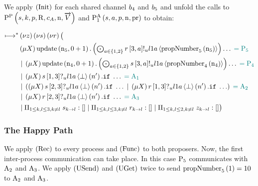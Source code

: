 We apply $\RInit$ for each shared channel $\SharedPoint{4}$ and $\SharedPoint{5}$ and unfold the calls to $\PpOne{\ChannelS, \ProcessIndexK, \ProposerRole, \QRoles, \AcceptorCount, \NumberRegister, \VectorV}$ and $\PaOne{\ChannelS, \AcceptorRole, \ProposerRole, \NumberRegister, \ProposalRegister}$ to obtain:

\begin{align*}
\mapstostar& \NuChannels\big (\\
&\Mu{\RecursionVariable} \update{\NumberRegister_5}{0 + 1} . \DotForall{\AcceptorRole\in \Curly{1, 2}}{\SendUnreliableP{\ChannelR}{3}{\AcceptorRole}{\LOneA}{\proposalNumber{\NumberRegister_5}{5}}}\ldots \comment{= \Proposer{5}}\\
&\Or \Mu{\RecursionVariable} \update{\NumberRegister_4}{0 + 1} . \DotForall{\AcceptorRole\in \Curly{1, 2}}{\SendUnreliableP{\ChannelS}{3}{\AcceptorRole}{\LOneA}{\proposalNumber{\NumberRegister_4}{4}}}\ldots \comment{= \Proposer{4}}\\
&\Or
    \Mu{\RecursionVariable}
    \ReceiveUnreliableP{\ChannelS}{1}{3}{\LOneA}{\bot}{n'}.
    \If \ldots \comment{= \Acceptor{1}}\\
&\Or \Paren{
    \Mu{\RecursionVariable} \ReceiveUnreliableP{\ChannelS}{2}{3}{\LOneA}{\bot}{n'}.\If \ldots
    \Or \Mu{\RecursionVariable} \ReceiveUnreliableP{\ChannelR}{1}{3}{\LOneA}{\bot}{n'}.\If \ldots
} \comment{= \Acceptor{2}}\\
&\Or \Mu{\RecursionVariable} \ReceiveUnreliableP{\ChannelR}{2}{3}{\LOneA}{\bot}{n'}.\If \ldots \comment{= \Acceptor{3}}\\
&\Or \InnerSessionQueues{\ChannelS}
\Or \InnerSessionQueues{\ChannelR}
\Or \OuterSessionQueues
\big )
\end{align*}

\subsubsection{The Happy Path}
We apply $\RRec$ to every process and $\RSideEffect$ to both proposers.
Now, the first inter-process communication can take place.
In this case $\Proposer{5}$ communicates with $\Acceptor{2}$ and $\Acceptor{3}$.
We apply $\RUsend$ and $\RUget$ twice to send $\proposalNumber{1}{5} = 10$ to $\Acceptor{2}$ and $\Acceptor{3}$.

